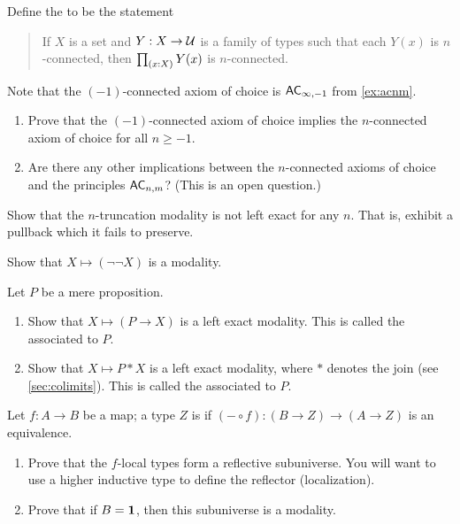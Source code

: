 \begin{ex}\label{ex:acconn}
  Define the 
  to be the statement
  \begin{quote}
    If $X$ is a set and $Y:X\to \mathcal{U}$ is a family of types such that each $Y(x)$ is $n$-connected, then $\prd{x:X} Y(x)$ is $n$-connected.
  \end{quote}
  Note that the $(-1)$-connected axiom of choice is $\mathsf{AC}_{\infty,-1}$ from \autoref{ex:acnm}.
  \begin{enumerate}
  \item Prove that the $(-1)$-connected axiom of choice implies the $n$-con\-nect\-ed axiom of choice for all $n\ge -1$.
  \item Are there any other implications between the $n$-connected axioms of choice and the principles $\mathsf{AC}_{n,m}$?
    (This is an open question.)
  \end{enumerate}
\end{ex}

\begin{ex}
  Show that the $n$-truncation modality is not left exact for any $n$.
  That is, exhibit a pullback which it fails to preserve.
\end{ex}

\begin{ex}
  Show that $X\mapsto (\neg\neg X)$ is a modality.
\end{ex}

\begin{ex}
  Let $P$ be a mere proposition.
  \begin{enumerate}
  \item Show that $X\mapsto (P\to X)$ is a left exact modality.
    This is called the 
    associated to $P$.
  \item Show that $X\mapsto P*X$ is a left exact modality, where $*$ denotes the join (see \autoref{sec:colimits}).
    This is called the 
    associated to $P$.
  \end{enumerate}
\end{ex}

\begin{ex}
  Let $f:A\to B$ be a map; a type $Z$ is 
  if $(-\circ f):(B\to Z) \to (A\to Z)$ is an equivalence.
  \begin{enumerate}
  \item Prove that the $f$-local types form a reflective subuniverse.
    You will want to use a higher inductive type to define the reflector (localization).
  \item Prove that if $B=\mathbf{1}$, then this subuniverse is a modality.
  \end{enumerate}
\end{ex}

